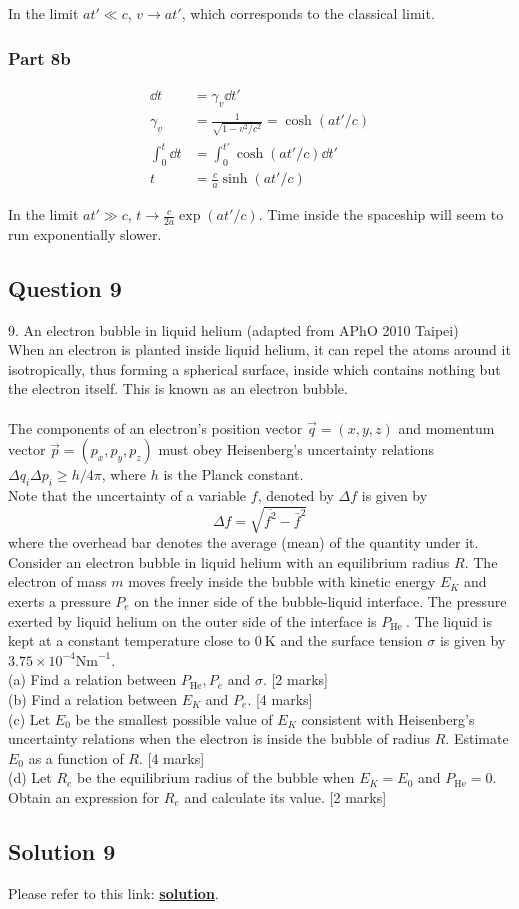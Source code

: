 \documentclass{article}
\begin{document}
In the limit $at' \ll c$, $v\rightarrow at'$, which corresponds to the classical limit.

\subsubsection{Part 8b}
\begin{align}
    \dd{t} &= \gamma_v \dd{t'} \\
    \gamma_v &= \frac{1}{\sqrt{1-v^2/c^2}} = \cosh(at'/c) \\
    \int_0^t \dd{t} &= \int_0 ^ {t'} \cosh(at'/c) \dd{t'} \\
    t&=\frac{c}{a} \sinh(at'/c)
\end{align}

In the limit $at' \gg c$, $t \rightarrow \frac{c}{2a}\exp(at'/c)$. Time inside the spaceship will seem to run exponentially slower. 

\subsection{Question 9}
9. An electron bubble in liquid helium (adapted from APhO 2010 Taipei) \\
When an electron is planted inside liquid helium, it can repel the atoms around it isotropically, thus forming a spherical surface, inside which contains nothing but the electron itself. This is known as an electron bubble. \\
\\
The components of an electron's position vector $\vec{q}=(x, y, z)$ and momentum vector $\vec{p}=\left(p_{x}, p_{y}, p_{z}\right)$ must obey Heisenberg's uncertainty relations $\Delta q_{i} \Delta p_{i} \geq h / 4 \pi$, where $h$ is the Planck constant. \\
Note that the uncertainty of a variable $f$, denoted by $\Delta f$ is given by
$$
\Delta f=\sqrt{\overline{f^{2}}-\bar{f}^{2}}
$$
where the overhead bar denotes the average (mean) of the quantity under it. \\
Consider an electron bubble in liquid helium with an equilibrium radius $R$. The electron of mass $m$ moves freely inside the bubble with kinetic energy $E_{K}$ and exerts a pressure $P_{e}$ on the inner side of the bubble-liquid interface. The pressure exerted by liquid helium on the outer side of the interface is $P_{\text {He }}$. The liquid is kept at a constant temperature close to $0 \mathrm{~K}$ and the surface tension $\sigma$ is given by $3.75 \times 10^{-4} \mathrm{Nm}^{-1}$.  \\
(a) Find a relation between $P_{\mathrm{He}}, P_{e}$ and $\sigma$. [2 marks] \\
(b) Find a relation between $E_{K}$ and $P_{e}$. [4 marks] \\
(c) Let $E_{0}$ be the smallest possible value of $E_{K}$ consistent with Heisenberg's uncertainty relations when the electron is inside the bubble of radius $R$. Estimate $E_{0}$ as a function of $R$. [4 marks] \\
(d) Let $R_{e}$ be the equilibrium radius of the bubble when $E_{K}=E_{0}$ and $P_{\mathrm{He}}=0 .$ Obtain an expression for $R_{e}$ and calculate its value. [2 marks]

\subsection{Solution 9}
Please refer to this link: \textbf{\href{http://asianphysicsolympiad.org/download/past_APhO_roblems/2010_APhO/2010_APhO_Theoretical_Question_3_Solution.pdf}{solution}}.
\end{document}
